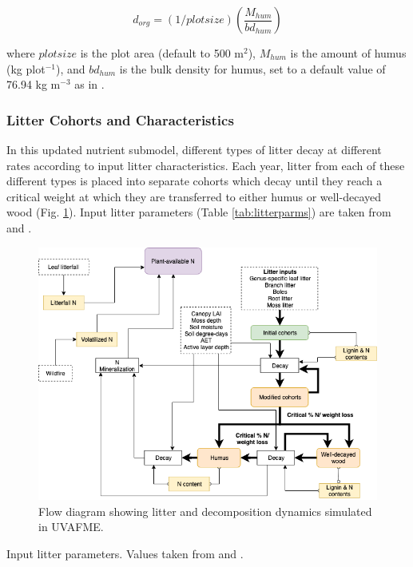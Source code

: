 \documentclass[a4paper, 12pt] {report}
\begin{document}
\begin{equation}
d_{org} = (1/plotsize)(\frac{M_{hum}}{bd_{hum}})
\end{equation}

where $plotsize$ is the plot area (default to 500 m$^2$), $M_{hum}$ is the amount of humus (kg plot$^{-1}$), and $bd_{hum}$ is the bulk density for humus, set to a default value of 76.94 kg m$^{-3}$ as in .

\subsubsection{Litter Cohorts and Characteristics}
In this updated nutrient submodel, different types of litter decay at different rates according to input litter characteristics. Each year, litter from each of these different types is placed into separate cohorts which decay until they reach a critical weight at which they are transferred to either humus or well-decayed wood (Fig. \ref{fig:nutrientdiagram}). Input litter parameters (Table \ref{tab:litterparms}) are taken from  and .

\begin{figure}
  \includegraphics[width=\linewidth]{Figures/SoilNutrients.png}
  \caption{Flow diagram showing litter and decomposition dynamics simulated in UVAFME.}
  \label{fig:nutrientdiagram}
\end{figure}

\begin{table}
 \begin{center}
    \caption{Input litter parameters. Values taken from \protect{} and \protect{}.}
    \label{tab:litterparms}
\end{center}
\end{table}
\end{document}
